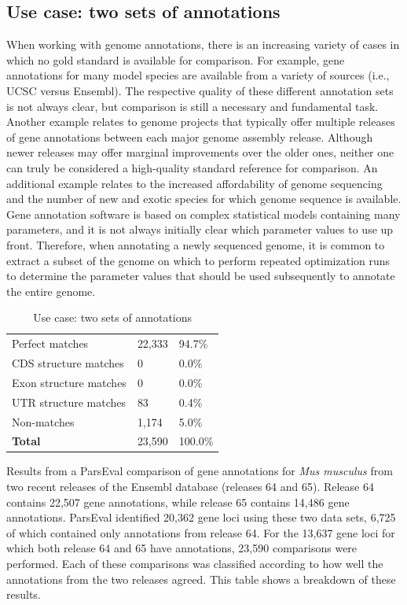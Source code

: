 \subsection{Use case: two sets of annotations}
When working with genome annotations, there is an increasing variety of cases in which no gold standard is available for comparison.
For example, gene annotations for many model species are available from a variety of sources (i.e., UCSC versus Ensembl).
The respective quality of these different annotation sets is not always clear, but comparison is still a necessary and fundamental task.
Another example relates to genome projects that typically offer multiple releases of gene annotations between each major genome assembly release.
Although newer releases may offer marginal improvements over the older ones, neither one can truly be considered a high-quality standard reference for comparison.
An additional example relates to the increased affordability of genome sequencing and the number of new and exotic species for which genome sequence is available.
Gene annotation software is based on complex statistical models containing many parameters, and it is not always initially clear which parameter values to use up front.
Therefore, when annotating a newly sequenced genome, it is common to extract a subset of the genome on which to perform repeated optimization runs to determine the parameter values that should be used subsequently to annotate the entire genome.

\begin{table}
\caption{Use case: two sets of annotations}
\begin{tabularx}{\textwidth}{p{7cm}R{3cm}R{3cm}}
\hline
  Perfect matches         &  22,333  &  94.7\%  \\
  CDS structure matches   &  0       &  0.0\%   \\
  Exon structure matches  &  0       &  0.0\%   \\
  UTR structure matches   &  83      &  0.4\%   \\
  Non-matches             &  1,174   &  5.0\%   \\ \hline
  \textbf{Total}          &  23,590  & 100.0\%  \\ \hline
\end{tabularx}
\label{Table:UseCaseTwoAnnotations}
\raggedright
{\scriptsize
Results from a ParsEval comparison of gene annotations for
\textit{Mus musculus} from
two recent releases of the Ensembl database (releases 64 and 65). Release 64
contains 22,507 gene annotations, while release 65 contains 14,486 gene
annotations. ParsEval identified 20,362 gene loci using these two data sets, 6,725
of which contained only annotations from release 64. For the 13,637 gene loci
for which both release 64 and 65 have annotations, 23,590 comparisons were
performed. Each of these comparisons was classified according to how well the
annotations from the two releases agreed. This table shows a breakdown of
these results.
}
\end{table}

